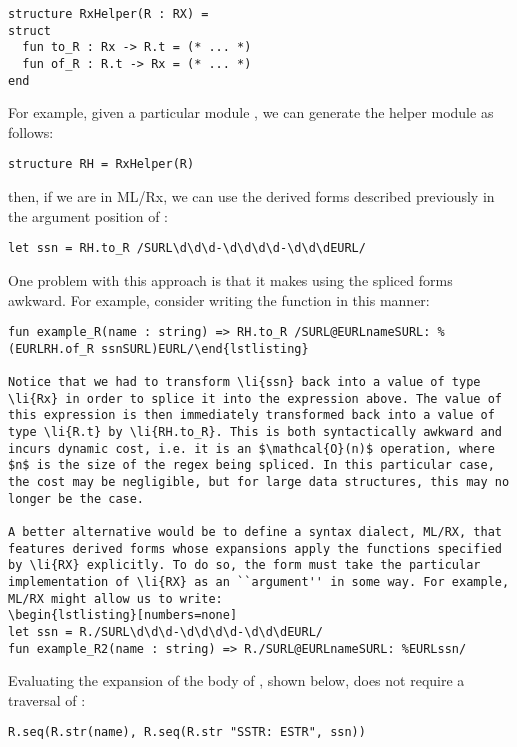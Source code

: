 {{\begin{lstlisting}[numbers=none]
structure RxHelper(R : RX) = 
struct
  fun to_R : Rx -> R.t = (* ... *)
  fun of_R : R.t -> Rx = (* ... *)
end
\end{lstlisting}

For example, given a particular module , we can generate the helper module  as follows:

\begin{lstlisting}[numbers=none]
structure RH = RxHelper(R)
\end{lstlisting}

then, if we are in ML/Rx, we can use the derived forms described previously in the argument position of :

\begin{lstlisting}[numbers=none]
let ssn = RH.to_R /SURL\d\d\d-\d\d\d\d-\d\d\dEURL/
\end{lstlisting}

One problem with this approach is that it makes using the spliced forms awkward. For example, consider writing the function  in this manner:

\begin{lstlisting}[numbers=none]
fun example_R(name : string) => RH.to_R /SURL@EURLnameSURL: %(EURLRH.of_R ssnSURL)EURL/\end{lstlisting}

Notice that we had to transform \li{ssn} back into a value of type \li{Rx} in order to splice it into the expression above. The value of this expression is then immediately transformed back into a value of type \li{R.t} by \li{RH.to_R}. This is both syntactically awkward and incurs dynamic cost, i.e. it is an $\mathcal{O}(n)$ operation, where $n$ is the size of the regex being spliced. In this particular case, the cost may be negligible, but for large data structures, this may no longer be the case.

A better alternative would be to define a syntax dialect, ML/RX, that features derived forms whose expansions apply the functions specified by \li{RX} explicitly. To do so, the form must take the particular implementation of \li{RX} as an ``argument'' in some way. For example, ML/RX might allow us to write:
\begin{lstlisting}[numbers=none]
let ssn = R./SURL\d\d\d-\d\d\d\d-\d\d\dEURL/
fun example_R2(name : string) => R./SURL@EURLnameSURL: %EURLssn/
\end{lstlisting}

Evaluating the expansion of the body of , shown below,  does not require a traversal of :
\begin{lstlisting}[numbers=none]
R.seq(R.str(name), R.seq(R.str "SSTR: ESTR", ssn))
\end{lstlisting}

}}
